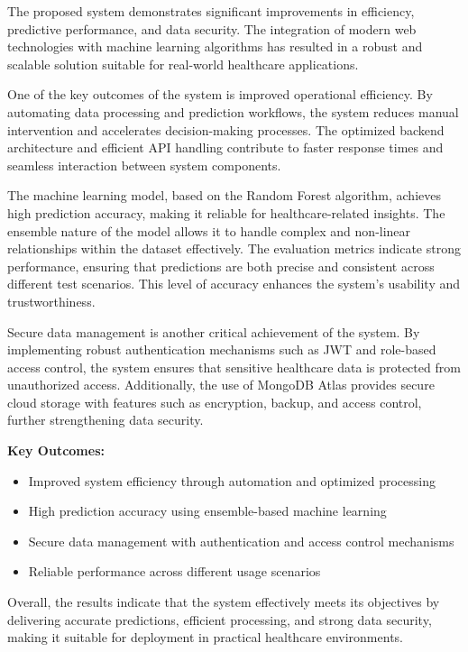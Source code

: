 \documentclass[conference]{IEEEtran}
\begin{document}
The proposed system demonstrates significant improvements in efficiency, predictive performance, and data security. The integration of modern web technologies with machine learning algorithms has resulted in a robust and scalable solution suitable for real-world healthcare applications.

One of the key outcomes of the system is improved operational efficiency. By automating data processing and prediction workflows, the system reduces manual intervention and accelerates decision-making processes. The optimized backend architecture and efficient API handling contribute to faster response times and seamless interaction between system components.

The machine learning model, based on the Random Forest algorithm, achieves high prediction accuracy, making it reliable for healthcare-related insights. The ensemble nature of the model allows it to handle complex and non-linear relationships within the dataset effectively. The evaluation metrics indicate strong performance, ensuring that predictions are both precise and consistent across different test scenarios. This level of accuracy enhances the system's usability and trustworthiness.

Secure data management is another critical achievement of the system. By implementing robust authentication mechanisms such as JWT and role-based access control, the system ensures that sensitive healthcare data is protected from unauthorized access. Additionally, the use of MongoDB Atlas provides secure cloud storage with features such as encryption, backup, and access control, further strengthening data security.

\textbf{Key Outcomes:}
\begin{itemize}
\item Improved system efficiency through automation and optimized processing
\item High prediction accuracy using ensemble-based machine learning
\item Secure data management with authentication and access control mechanisms
\item Reliable performance across different usage scenarios
\end{itemize}

Overall, the results indicate that the system effectively meets its objectives by delivering accurate predictions, efficient processing, and strong data security, making it suitable for deployment in practical healthcare environments.
 
\end{document}
